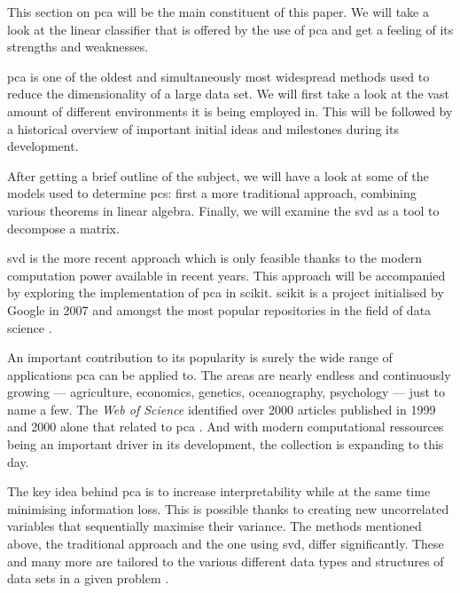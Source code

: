 This section on \gls{pca} will be the main constituent of this paper.
We will take a look at the linear classifier that is offered by the use of \gls{pca} and get a feeling of its strengths and weaknesses.
\bigskip


\Gls{pca} is one of the oldest and simultaneously most widespread methods used to reduce the dimensionality of a large data set.
We will first take a look at the vast amount of different environments it is being employed in.
This will be followed by a historical overview of important initial ideas and milestones during its development.

After getting a brief outline of the subject, we will have a look at some of the models used to determine \glspl{pc}: first a more traditional approach, combining various theorems in linear algebra. 
Finally, we will examine the \gls{svd} as a tool to decompose a matrix.

\Gls{svd} is the more recent approach which is only feasible thanks to the modern computation power available in recent years.
This approach will be accompanied by exploring the implementation of \gls{pca} in \gls{scikit}.
\Gls{scikit} is a project initialised by Google in 2007 and amongst the most popular repositories in the field of data science \cite{scikit-learn}.
\bigskip


An important contribution to its popularity is surely the wide range of applications \gls{pca} can be applied to.
The areas are nearly endless and continuously growing --- agriculture, economics, genetics, oceanography, psychology --- just to name a few.
The \emph{Web of Science} identified over 2000 articles published in 1999 and 2000 alone that related to \gls{pca} \cite{Jolliffe2002book}.
And with modern computational ressources being an important driver in its development, the collection is expanding to this day.
\bigskip


The key idea behind \gls{pca} is to increase interpretability while at the same time minimising information loss. 
This is possible thanks to creating new uncorrelated variables that sequentially maximise their variance.
The methods mentioned above, the traditional approach and the one using \gls{svd}, differ significantly. 
These and many more are tailored to the various different data types and structures of data sets in a given problem \cite{jolliffe2016principal}.

